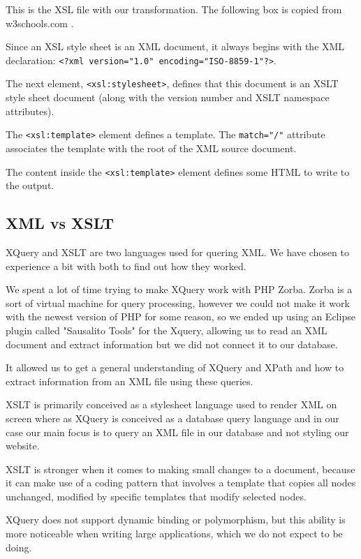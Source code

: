 \documentclass[a4paper,12pt]{article}
\begin{document}
This is the XSL file with our transformation. The following box is copied from w3schools.com \citep{w3xslt}.

\begin{framed}
Since an XSL style sheet is an XML document, it always begins with the XML declaration: \lstinline$<?xml version="1.0" encoding="ISO-8859-1"?>$.

The next element, \lstinline$<xsl:stylesheet>$, defines that this document is an XSLT style sheet document (along with the version number and XSLT namespace attributes).

The \lstinline$<xsl:template>$ element defines a template. The \lstinline$match="/"$ attribute associates the template with the root of the XML source document.

The content inside the \lstinline$<xsl:template>$ element defines some HTML to write to the output.
\end{framed}

\subsection{XML vs XSLT}

XQuery and XSLT are two languages used for quering XML. We have chosen to experience a bit with both  to find out how they worked.

We spent a lot of time trying to make XQuery work with PHP Zorba. Zorba is a sort of virtual machine for query processing, however we could not make it work with the newest version of PHP for some reason, so we ended up using an Eclipse plugin called  "Sausalito Tools" for the Xquery, allowing us to read an XML document and extract information but we did not connect it to our database. 

It allowed us to get a general understanding of XQuery and XPath and how to extract information from an XML file using these queries. 

XSLT is primarily conceived as a stylesheet language used to render XML on screen where as XQuery is conceived as a database query language and in our case our main focus is to query an XML file in our database and not styling our website. 

XSLT is stronger when it comes to making small changes to a document, because it can make use of a coding pattern that involves a template that copies all nodes unchanged, modified by specific templates that modify selected nodes.

XQuery does not support dynamic binding or polymorphism, but this ability is more noticeable when writing large applications, which we do not expect to be doing. 


\end{document}
